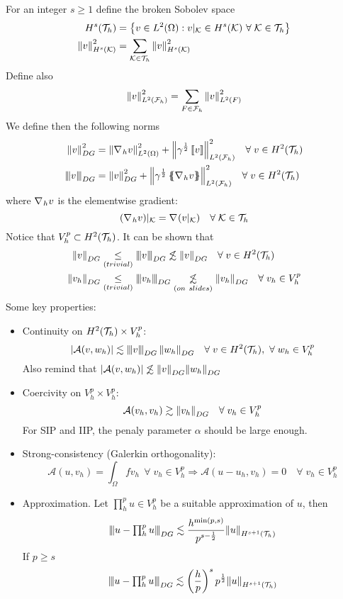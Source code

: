 For an integer \(s \geq 1\) define the broken Sobolev space
\begin{align*}
    H^s(\mathcal{T}_h) &= \left\{ v \in L^2(\Omega) : v\vert_{\mathcal{K}} \in H^s(\mathcal{K}) \ \forall \;\mathcal{K} \in \mathcal{T}_h\right\} \\
    \norm{v}^2_{H^s(\mathcal{K})} &= \sum_{\mathcal{K} \in \mathcal{T}_h} \norm{v}^2_{H^s(\mathcal{K})}
\end{align*}
Define also 
\[
    \norm{v}^2_{L^2(\mathcal{F}_h)} = \sum_{F \in \mathcal{F}_h} \norm{v}^2_{L^2(F)}
\]
We define then the following norms 
\begin{align*}
    \norm{v}^2_{DG} &= \norm{\grad_h v}^2_{L^2(\Omega)} + \norm{\gamma^{\frac{1}{2}}\jump{v}}^2_{L^2(\mathcal{F}_h)} \quad \forall \;v \in H^2(\triangulation) \\
    \threenorm{v}{DG} &= \norm{v}_{DG}^2 + \norm{\gamma ^{\frac{1}{2}} \average{\grad_h v}}^2_{L^2(\mathcal{F}_h)} \quad \forall \;v \in H^2(\triangulation)
\end{align*}
where \(\nabla\mspace{1mu}_h v\) is the elementwise gradient:
\[
    (\nabla\mspace{1mu}_h v)\vert_{\mathcal{K}} = \nabla\mspace{1mu}(v\vert_{\mathcal{K}}) \quad\forall \; \mathcal{K} \in \mathcal{T}_h
\]
Notice that \(V_h^p \subset H^2(\mathcal{T}_h)\). It can be shown that 
\begin{align*}
    \norm{v}_{DG} &\underset{(trivial)}{\leq} \threenorm{v}{DG} \not\lesssim \norm{v}_{DG} \quad \forall \; v \in H^2(\triangulation) \\
    \norm{v_h}_{DG} &\underset{(trivial)}{\leq} \threenorm{v_h}{DG} \underset{(on \ slides)}{\not\lesssim}\norm{v_h}_{DG} \quad \forall \; v_h \in V_h^p \\
\end{align*}
Some key properties:
\begin{itemize}
    \item Continuity on \(H^2(\mathcal{T}_h) \times V^p_h\): 
    \[
        \abs{\mathcal{A}(v, w_h)} \lesssim \threenorm{v}{DG} \norm{w_h}_{DG} \quad  \forall \; v \in H^2(\triangulation), \ \forall \; w_h \in V_h^p
    \]
    Also remind that \(\abs{\mathcal{A}(v, w_h)} \not\lesssim \norm{v}_{DG} \norm{w_h}_{DG}\)
    \item Coercivity on \(V_h^p \times V_h^p\): 
    \[
        \mathcal{A}(v_h, v_h) \gtrsim \norm{v_h}_{DG} \quad \forall \; v_h \in V_h^p
    \]
    For SIP and IIP, the penaly parameter \(\alpha\) should be large enough.
    \item  Strong-consistency (Galerkin orthogonality):
    \[
        \mathcal{A}(u,v_h) = \int_\Omega f v_h \ \ \forall \; v_h \in V_h^p \Rightarrow \mathcal{A}(u-u_h, v_h) = 0 \quad \forall \; v_h \in V_h^p
    \]
    \item Approximation. Let \(\prod_{h}^{p}u \in V_h^p\) be a suitable approximation of \(u\), then 
    \[
        \threenorm{u-{\textstyle \prod_{h}^{p}u}}{DG} \lesssim \frac{h^{\min(p,s)}}{p^{s-\frac{1}{2}}}\norm{u}_{H^{s+1}(\triangulation)}
    \]
    If \(p \geq s\)
    \[
        \threenorm{u-{\textstyle \prod_{h}^{p}u}}{DG} \lesssim \left( \frac{h}{p} \right)^s p^{\frac{1}{2}}\norm{u}_{H^{s+1}(\triangulation)}
    \]
\end{itemize}
